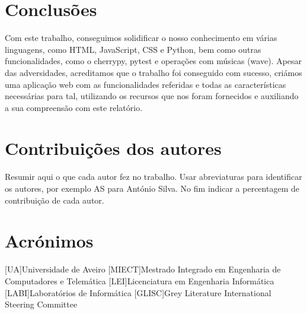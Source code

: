 \documentclass{report}
\begin{document}
\chapter{Conclusões}
\label{chap.conclusao}
Com este trabalho, conseguimos solidificar o nosso conhecimento em várias linguagens, como HTML, JavaScript, CSS e 
Python, bem como outras funcionalidades, como o cherrypy, pytest e operações com músicas (wave).
Apesar das adversidades, acreditamos que o trabalho foi conseguido com sucesso, criámos uma aplicação 
web com as funcionalidades referidas e todas as características necessárias para tal, utilizando os recursos que 
nos foram fornecidos e auxiliando a sua compreensão com este relatório.

\chapter*{Contribuições dos autores}
Resumir aqui o que cada autor fez no trabalho.
Usar abreviaturas para identificar os autores,
por exemplo AS para António Silva.
No fim indicar a percentagem de contribuição de cada autor.

\chapter*{Acrónimos}
\begin{acronym}
[UA]{Universidade de Aveiro}
[MIECT]{Mestrado Integrado em Engenharia de Computadores e Telemática}
[LEI]{Licenciatura em Engenharia Informática}
[LABI]{Laboratórios de Informática}
[GLISC]{Grey Literature International Steering Committee}
\end{acronym}


\printbibliography
\end{document}

